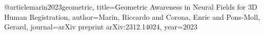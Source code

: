 @article{marin2023geometric,
  title={Geometric Awareness in Neural Fields for 3D Human Registration},
  author={Marin, Riccardo and Corona, Enric and Pons-Moll, Gerard},
  journal={arXiv preprint arXiv:2312.14024},
  year={2023}
}